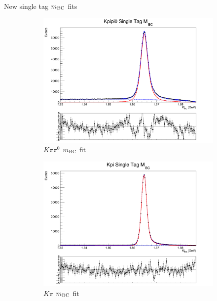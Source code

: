 \documentclass{beamer}
\begin{document}
\begin{frame}{New single tag $m_{\rm BC}$ fits}
  \begin{figure}
    \centering
    \begin{subfigure}{0.38\textwidth}
      \centering
      \includegraphics[width=\textwidth]{Plots/Kpipi0_SingleTag_MBC_Plot.png}
      \caption{$K\pi\pi^0$ $m_{\rm BC}$ fit}
    \end{subfigure}
    \begin{subfigure}{0.38\textwidth}
      \centering
      \includegraphics[width=\textwidth]{Plots/Kpi_SingleTag_MBC_Plot.png}
      \caption{$K\pi$ $m_{\rm BC}$ fit}
    \end{subfigure}%
    \begin{subfigure}{0.38\textwidth}

\end{subfigure}
\end{figure}
\end{frame}
\end{document}
